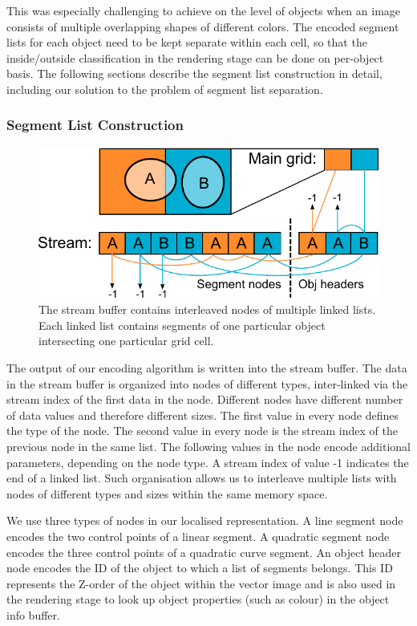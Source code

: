 \documentclass[11pt,a4paper,twoside]{article}
\begin{document}
This was especially challenging to achieve on the level of objects when an image consists of multiple overlapping shapes of different colors. The encoded segment lists for each object need to be kept separate within each cell, so that the inside/outside classification in the rendering stage can be done on per-object basis. The following sections describe the segment list construction in detail, including our solution to the problem of segment list separation.

\subsubsection {Segment List Construction}

\begin {figure} 
	\centering
	\includegraphics[width=0.6\columnwidth] {figures/obj_stream}
	\caption {The stream buffer contains interleaved nodes of multiple linked lists. Each linked list contains segments of one particular object intersecting one particular grid cell.}
	\label {fig:obj_stream}
\end {figure}

The output of our encoding algorithm is written into the stream buffer. The data in the stream buffer is organized into nodes of different types, inter-linked via the stream index of the first data in the node. Different nodes have different number of data values and therefore different sizes. The first value in every node defines the type of the node. The second value in every node is the stream index of the previous node in the same list. The following values in the node encode additional parameters, depending on the node type. A stream index of value -1 indicates the end of a linked list. Such organisation allows us to interleave multiple lists with nodes of different types and sizes within the same memory space.

We use three types of nodes in our localised representation. A line segment node encodes the two control points of a linear segment. A quadratic segment node encodes the three control points of a quadratic curve segment. An object header node encodes the ID of the object to which a list of segments belongs. This ID represents the Z-order of the object within the vector image and is also used in the rendering stage to look up object properties (such as colour) in the object info buffer.
\end{document}

